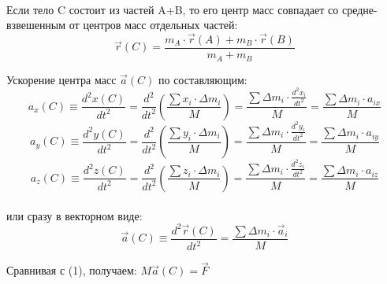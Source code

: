 \\[2mm]
Если тело C состоит из частей A+B, то его центр масс совпадает со средне-взвешенным от центров масс отдельных частей:
\begin{displaymath}
\vec{r}(C) =\frac{m_A\cdot\vec{r}(A)+m_B\cdot\vec{r}(B)}{m_A+m_B}
\end{displaymath}


Ускорение центра масс $\vec{a}(C)$ по составляющим:
\begin{displaymath}
a_x(C) \equiv \frac{d^2x(C)}{dt^2}
=\frac{d^2}{dt^2}\left(\frac{\sum x_i\cdot\Delta m_i}M\right)
=\frac{\sum \Delta m_i\cdot\frac{d^2x_i}{dt^2}}M
=\frac{\sum \Delta m_i\cdot a_{ix}}M
\end{displaymath}
\begin{displaymath}
a_y(C) \equiv \frac{d^2y(C)}{dt^2}
=\frac{d^2}{dt^2}\left(\frac{\sum y_i\cdot\Delta m_i}M\right)
=\frac{\sum \Delta m_i\cdot\frac{d^2y_i}{dt^2}}M
=\frac{\sum \Delta m_i\cdot a_{iy}}M
\end{displaymath}
\begin{displaymath}
a_z(C) \equiv \frac{d^2z(C)}{dt^2}
=\frac{d^2}{dt^2}\left(\frac{\sum z_i\cdot\Delta m_i}M\right)
=\frac{\sum \Delta m_i\cdot\frac{d^2z_i}{dt^2}}M
=\frac{\sum \Delta m_i\cdot a_{iz}}M
\end{displaymath}\\
или сразу в векторном виде:
\begin{displaymath}
\vec{a}(C) \equiv \frac{d^2\vec{r}(C)}{dt^2}
=\frac{\sum \Delta m_i\cdot \vec{a}_{i}}M
\end{displaymath}

Сравнивая с (1), получаем: \hspace{10mm}$M\vec{a}(C) =\vec{F}$
\\[3mm]
\\[1mm]


